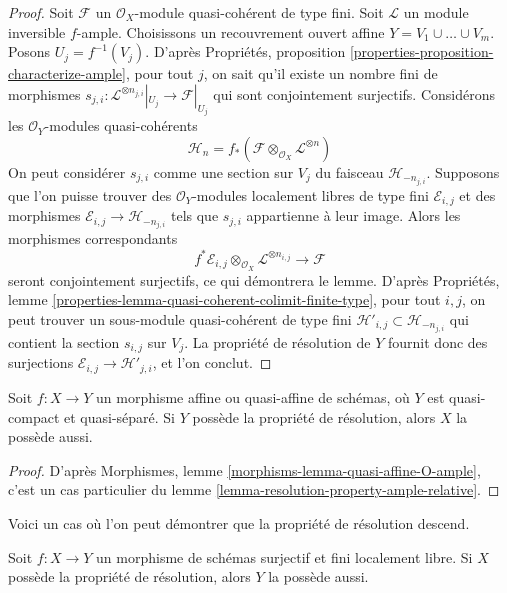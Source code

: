 \begin{proof}
Soit $\mathcal{F}$ un $\mathcal{O}_X$-module quasi-cohérent de type fini.
Soit $\mathcal{L}$ un module inversible $f$-ample.
Choisissons un recouvrement ouvert affine $Y = V_1 \cup \ldots \cup V_m$.
Posons $U_j = f^{-1}(V_j)$. D'après Propriétés, proposition
\ref{properties-proposition-characterize-ample},
pour tout $j$, on sait qu'il existe un nombre fini de morphismes
$s_{j, i} : \mathcal{L}^{\otimes n_{j, i}}|_{U_j} \to \mathcal{F}|_{U_j}$
qui sont conjointement surjectifs. Considérons les
$\mathcal{O}_Y$-modules quasi-cohérents
$$
\mathcal{H}_n =
f_*(\mathcal{F} \otimes_{\mathcal{O}_X} \mathcal{L}^{\otimes n})
$$
On peut considérer $s_{j, i}$ comme une section sur $V_j$ du faisceau
$\mathcal{H}_{-n_{j, i}}$. Supposons que l'on puisse trouver des
$\mathcal{O}_Y$-modules localement libres de type fini $\mathcal{E}_{i, j}$ et des morphismes
$\mathcal{E}_{i, j} \to \mathcal{H}_{-n_{j, i}}$ tels que
$s_{j, i}$ appartienne à leur image. Alors les morphismes correspondants
$$
f^*\mathcal{E}_{i, j}
\otimes_{\mathcal{O}_X}
\mathcal{L}^{\otimes n_{i, j}} \longrightarrow \mathcal{F}
$$
seront conjointement surjectifs, ce qui démontrera le lemme. D'après
Propriétés, lemme \ref{properties-lemma-quasi-coherent-colimit-finite-type},
pour tout $i, j$, on peut trouver un sous-module quasi-cohérent
de type fini
$\mathcal{H}'_{i, j} \subset  \mathcal{H}_{-n_{j, i}}$
qui contient la section $s_{i, j}$ sur $V_j$.
La propriété de résolution de $Y$ fournit donc des surjections
$\mathcal{E}_{i, j} \to \mathcal{H}'_{j, i}$, et l'on conclut.
\end{proof}

\begin{lemma}
\label{lemma-resolution-property-goes-up-affine}
Soit $f : X \to Y$ un morphisme affine ou quasi-affine de schémas, où
$Y$ est quasi-compact et quasi-séparé.
Si $Y$ possède la propriété de résolution, alors $X$ la possède aussi.
\end{lemma}

\begin{proof}
D'après Morphismes, lemme \ref{morphisms-lemma-quasi-affine-O-ample},
c'est un cas particulier du
lemme \ref{lemma-resolution-property-ample-relative}.
\end{proof}

\noindent
Voici un cas où l'on peut démontrer que la propriété de résolution descend.

\begin{lemma}
\label{lemma-resolution-property-goes-down-finite-flat}
Soit $f : X \to Y$ un morphisme de schémas surjectif et fini localement libre.
Si $X$ possède la propriété de résolution, alors $Y$ la possède aussi.
\end{lemma}

